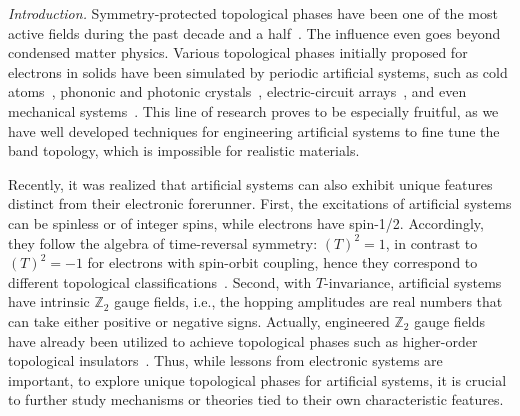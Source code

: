 \documentclass[aps,prl,twocolumn,noshowpacs,superscriptaddress]{revtex4-1}
\def \Z {\mathbb{Z}}
\begin{document}
{\color{blue}\textit{Introduction.}}
Symmetry-protected topological phases have been one of the most active fields during the past decade and a half~\cite{Hasan2010,Qi2011,Chiu2016,Bansil2016,Armitage2018}. The influence even goes beyond condensed matter physics. Various topological phases initially proposed for electrons in solids have been simulated by periodic artificial systems, such as cold atoms~\cite{Bloch2014,Zhang2018,Cooper2019}, phononic and photonic crystals~\cite{Lu2014,Wang2015,Zhang2015,Li2018,Ozawa2019,Yang2019,Zeng2020}, electric-circuit arrays~\cite{Imhof2018,Yu2020}, and even mechanical systems~\cite{Prodan2009,Huber2015,Hatsugai2017}. This line of research proves to be especially fruitful, as we have well developed techniques for engineering artificial systems to fine tune the band topology, which is impossible for realistic materials.

Recently, it was realized that artificial systems can also exhibit unique features distinct from their electronic forerunner. First, the excitations of artificial systems can be spinless or of integer spins, while electrons have spin-1/2. Accordingly, they follow the algebra of time-reversal symmetry: $(T)^2=1$, in contrast to $(T)^2=-1$ for electrons with spin-orbit coupling, hence they correspond to different topological classifications~\cite{Schnyder2008,Kitaev2009,zhaoPRL2013,zhaoPRL2016a}. Second, with $T$-invariance, artificial systems have intrinsic $\Z_2$ gauge fields, i.e., the hopping amplitudes are real numbers that can take either positive or negative signs. %
Actually, engineered $\Z_2$ gauge fields have already been utilized to achieve topological phases such as higher-order topological insulators~\cite{Keil2016,Peterson2018,Serra-Garcia2018,Bloch2019,Mittal2019,Xue2020,Ni2020,Qi2020}. Thus, while lessons from electronic systems are important, to explore unique topological phases for artificial systems, it is crucial to further study mechanisms or theories tied to their own characteristic features.
\end{document}
